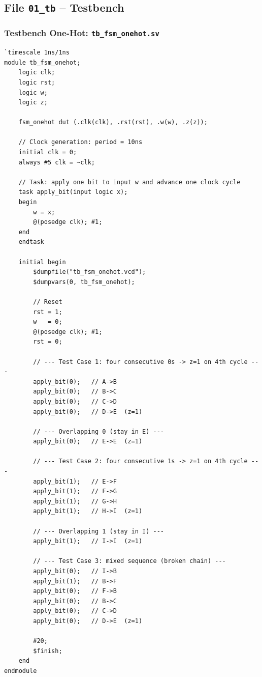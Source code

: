 \documentclass[12pt, a4paper]{article}
\begin{document}
\subsection{File \texttt{01\_tb} -- Testbench}
\label{subsec:exp3-tb}

\subsubsection{Testbench One-Hot: \texttt{tb\_fsm\_onehot.sv}}

\begin{lstlisting}[caption={\texttt{01\_tb/tb\_fsm\_onehot.sv} -- Testbench cho fsm\_onehot.},
                   label={lst:exp3-tb-oh}]
`timescale 1ns/1ns
module tb_fsm_onehot;
    logic clk;
    logic rst;
    logic w;
    logic z;

    fsm_onehot dut (.clk(clk), .rst(rst), .w(w), .z(z));

    // Clock generation: period = 10ns
    initial clk = 0;
    always #5 clk = ~clk;

    // Task: apply one bit to input w and advance one clock cycle
    task apply_bit(input logic x);
    begin
        w = x;
        @(posedge clk); #1;
    end
    endtask

    initial begin
        $dumpfile("tb_fsm_onehot.vcd");
        $dumpvars(0, tb_fsm_onehot);

        // Reset
        rst = 1;
        w   = 0;
        @(posedge clk); #1;
        rst = 0;

        // --- Test Case 1: four consecutive 0s -> z=1 on 4th cycle ---
        apply_bit(0);   // A->B
        apply_bit(0);   // B->C
        apply_bit(0);   // C->D
        apply_bit(0);   // D->E  (z=1)

        // --- Overlapping 0 (stay in E) ---
        apply_bit(0);   // E->E  (z=1)

        // --- Test Case 2: four consecutive 1s -> z=1 on 4th cycle ---
        apply_bit(1);   // E->F
        apply_bit(1);   // F->G
        apply_bit(1);   // G->H
        apply_bit(1);   // H->I  (z=1)

        // --- Overlapping 1 (stay in I) ---
        apply_bit(1);   // I->I  (z=1)

        // --- Test Case 3: mixed sequence (broken chain) ---
        apply_bit(0);   // I->B
        apply_bit(1);   // B->F
        apply_bit(0);   // F->B
        apply_bit(0);   // B->C
        apply_bit(0);   // C->D
        apply_bit(0);   // D->E  (z=1)

        #20;
        $finish;
    end
endmodule
\end{lstlisting}
\end{document}
